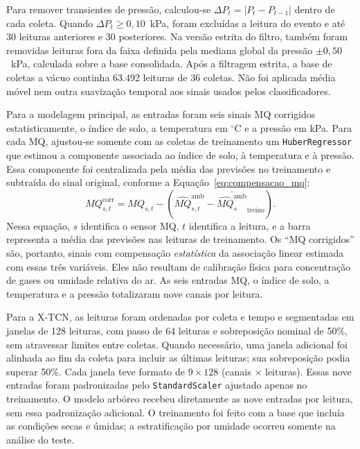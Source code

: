Para remover transientes de pressão, calculou-se
$\Delta P_t=|P_t-P_{t-1}|$ dentro de cada coleta. Quando
$\Delta P_t\geq 0{,}10$~kPa, foram excluídas a leitura do evento e até
30 leituras anteriores e 30 posteriores. Na versão estrita do filtro,
também foram removidas leituras fora da faixa definida pela mediana global
da pressão $\pm 0{,}50$~kPa, calculada sobre a base consolidada. Após a
filtragem estrita, a base de coletas a vácuo continha 63.492 leituras de
36 coletas. Não foi aplicada média móvel nem outra suavização temporal
aos sinais usados pelos classificadores.

Para a modelagem principal, as entradas foram seis sinais MQ corrigidos
estatisticamente, o índice de solo, a temperatura em $^{\circ}$C e a
pressão em kPa. Para cada MQ, ajustou-se somente com as coletas de
treinamento um \texttt{HuberRegressor} que estimou a componente associada
ao índice de solo, à temperatura e à pressão. Essa componente foi
centralizada pela média das previsões no treinamento e subtraída do
sinal original, conforme a Equação~\eqref{eq:compensacao_mq}:
\begin{equation}
    \label{eq:compensacao_mq}
    MQ_{s,t}^{\mathrm{corr}} = MQ_{s,t} -
    \left(\widehat{MQ}_{s,t}^{\mathrm{amb}}-
    \overline{\widehat{MQ}_{s}^{\mathrm{amb}}}_{\mathrm{treino}}\right).
\end{equation}
Nessa equação, $s$ identifica o sensor MQ, $t$ identifica a leitura, e a
barra representa a média das previsões nas leituras de treinamento. Os
``MQ corrigidos'' são, portanto, sinais com compensação \emph{estatística}
da associação linear estimada com essas três variáveis. Eles não resultam
de calibração física para concentração de gases ou umidade relativa do ar.
As seis entradas MQ, o índice de solo, a temperatura e a pressão totalizaram
nove canais por leitura.

Para a X-TCN, as leituras foram ordenadas por coleta e tempo e segmentadas
em janelas de 128 leituras, com passo de 64 leituras e sobreposição nominal
de 50\%, sem atravessar limites entre coletas. Quando necessário, uma
janela adicional foi alinhada ao fim da coleta para incluir as últimas
leituras; sua sobreposição podia superar 50\%. Cada janela teve formato de
$9\times128$ (canais $\times$ leituras). Essas nove entradas foram
padronizadas pelo \texttt{StandardScaler} ajustado apenas no treinamento.
O modelo arbóreo recebeu diretamente as nove entradas por leitura, sem
essa padronização adicional. O treinamento foi feito com a base que
incluía as condições secas e úmidas; a estratificação por umidade ocorreu
somente na análise do teste.

